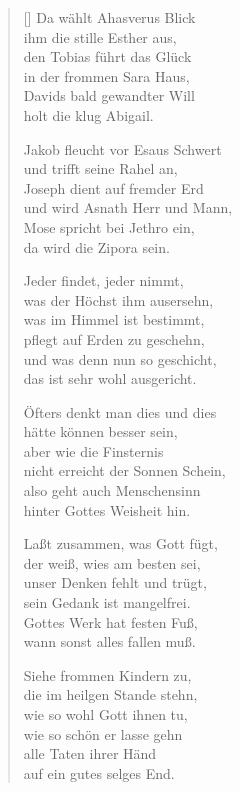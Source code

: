 \begin{multicols}{2}
\begin{verse}[\versewidth]
 Da wählt Ahasverus Blick\\
ihm die stille Esther aus,\\
den Tobias führt das Glück\\
in der frommen Sara Haus,\\
Davids bald gewandter Will\\
holt die klug Abigail.

 Jakob fleucht vor Esaus Schwert\\
und trifft seine Rahel an,\\
Joseph dient auf fremder Erd\\
und wird Asnath Herr und Mann,\\
Mose spricht bei Jethro ein,\\
da wird die Zipora sein.

 Jeder findet, jeder nimmt,\\
was der Höchst ihm ausersehn,\\
was im Himmel ist bestimmt,\\
pflegt auf Erden zu geschehn,\\
und was denn nun so geschicht,\\
das ist sehr wohl ausgericht.

 Öfters denkt man dies und dies\\
hätte können besser sein,\\
aber wie die Finsternis\\
nicht erreicht der Sonnen Schein,\\
also geht auch Menschensinn\\
hinter Gottes Weisheit hin.

 Laßt zusammen, was Gott fügt,\\
der weiß, wies am besten sei,\\
unser Denken fehlt und trügt,\\
sein Gedank ist mangelfrei.\\
Gottes Werk hat festen Fuß,\\
wann sonst alles fallen muß.

 Siehe frommen Kindern zu,\\
die im heilgen Stande stehn,\\
wie so wohl Gott ihnen tu,\\
wie so schön er lasse gehn\\
alle Taten ihrer Händ\\
auf ein gutes selges End.


\end{verse}
\end{multicols}
